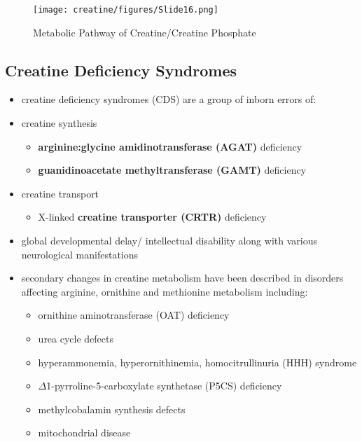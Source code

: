 \documentclass[12pt]{scrartcl}
\begin{document}
\begin{figure}[htbp]
\centering
\texttt{[image: creatine/figures/Slide16.png]}
\caption{\label{fig:org068010f}Metabolic Pathway of Creatine/Creatine Phosphate}
\end{figure}

\subsection{Creatine Deficiency Syndromes}
\label{sec:org30b288d}
\begin{itemize}
\item creatine deficiency syndromes (CDS) are a group of inborn errors of:
\item creatine synthesis
\begin{itemize}
\item \textbf{arginine:glycine amidinotransferase (AGAT)} deficiency
\item \textbf{guanidinoacetate methyltransferase (GAMT)} deficiency
\end{itemize}
\item creatine transport
\begin{itemize}
\item X-linked \textbf{creatine transporter (CRTR)} deficiency
\end{itemize}
\item global developmental delay/ intellectual disability along with
various neurological manifestations

\item secondary changes in creatine metabolism have been described in
disorders affecting arginine, ornithine and methionine metabolism including:
\begin{itemize}
\item ornithine aminotransferase (OAT) deficiency
\item urea cycle defects
\item hyperammonemia, hyperornithinemia, homocitrullinuria (HHH) syndrome
\item \(\Delta\)1-pyrroline-5-carboxylate synthetase (P5CS) deficiency
\item methylcobalamin synthesis defects
\item mitochondrial disease
\end{itemize}
\end{itemize}
\end{document}
